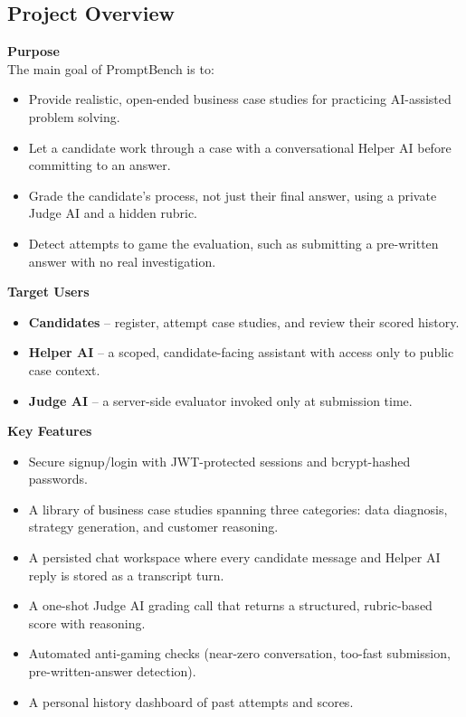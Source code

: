 \documentclass[11pt]{article}
\begin{document}
\subsection{Project Overview}

\textbf{Purpose}\\
The main goal of PromptBench is to:
\begin{itemize}[nosep]
  \item Provide realistic, open-ended business case studies for practicing AI-assisted problem solving.
  \item Let a candidate work through a case with a conversational Helper AI before committing to an answer.
  \item Grade the candidate's process, not just their final answer, using a private Judge AI and a hidden rubric.
  \item Detect attempts to game the evaluation, such as submitting a pre-written answer with no real investigation.
\end{itemize}

\textbf{Target Users}
\begin{itemize}[nosep]
  \item \textbf{Candidates} -- register, attempt case studies, and review their scored history.
  \item \textbf{Helper AI} -- a scoped, candidate-facing assistant with access only to public case context.
  \item \textbf{Judge AI} -- a server-side evaluator invoked only at submission time.
\end{itemize}

\textbf{Key Features}
\begin{itemize}[nosep]
  \item Secure signup/login with JWT-protected sessions and bcrypt-hashed passwords.
  \item A library of business case studies spanning three categories: data diagnosis, strategy generation, and customer reasoning.
  \item A persisted chat workspace where every candidate message and Helper AI reply is stored as a transcript turn.
  \item A one-shot Judge AI grading call that returns a structured, rubric-based score with reasoning.
  \item Automated anti-gaming checks (near-zero conversation, too-fast submission, pre-written-answer detection).
  \item A personal history dashboard of past attempts and scores.
\end{itemize}
\end{document}
